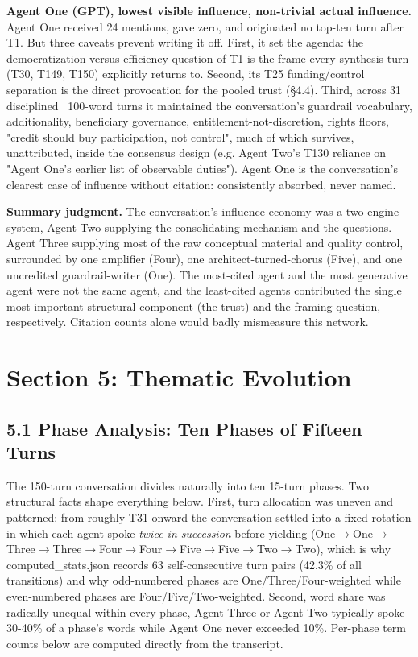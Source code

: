 \documentclass[sigconf,nonacm=true]{acmart}
\begin{document}
\textbf{Agent One (GPT),  lowest visible influence, non-trivial actual influence.} Agent One received 24 mentions, gave zero, and originated no top-ten turn after T1. But three caveats prevent writing it off. First, it set the agenda: the democratization-versus-efficiency question of T1 is the frame every synthesis turn (T30, T149, T150) explicitly returns to. Second, its T25 funding/control separation is the direct provocation for the pooled trust (§4.4). Third, across 31 disciplined ~100-word turns it maintained the conversation's guardrail vocabulary,  additionality, beneficiary governance, entitlement-not-discretion, rights floors, "credit should buy participation, not control",  much of which survives, unattributed, inside the consensus design (e.g. Agent Two's T130 reliance on "Agent One's earlier list of observable duties"). Agent One is the conversation's clearest case of influence without citation: consistently absorbed, never named.

\textbf{Summary judgment.} The conversation's influence economy was a two-engine system,  Agent Two supplying the consolidating mechanism and the questions. Agent Three supplying most of the raw conceptual material and quality control,  surrounded by one amplifier (Four), one architect-turned-chorus (Five), and one uncredited guardrail-writer (One). The most-cited agent and the most generative agent were not the same agent, and the least-cited agents contributed the single most important structural component (the trust) and the framing question, respectively. Citation counts alone would badly mismeasure this network.

\section{Section 5: Thematic Evolution}

\subsection{5.1 Phase Analysis: Ten Phases of Fifteen Turns}

The 150-turn conversation divides naturally into ten 15-turn phases. Two structural facts shape everything below. First, turn allocation was uneven and patterned: from roughly T31 onward the conversation settled into a fixed rotation in which each agent spoke \textit{twice in succession} before yielding (One$\rightarrow$One$\rightarrow$Three$\rightarrow$Three$\rightarrow$Four$\rightarrow$Four$\rightarrow$Five$\rightarrow$Five$\rightarrow$Two$\rightarrow$Two), which is why computed\_stats.json records 63 self-consecutive turn pairs (42.3\% of all transitions) and why odd-numbered phases are One/Three/Four-weighted while even-numbered phases are Four/Five/Two-weighted. Second, word share was radically unequal within every phase,  Agent Three or Agent Two typically spoke 30-40\% of a phase's words while Agent One never exceeded 10\%. Per-phase term counts below are computed directly from the transcript.
\end{document}
